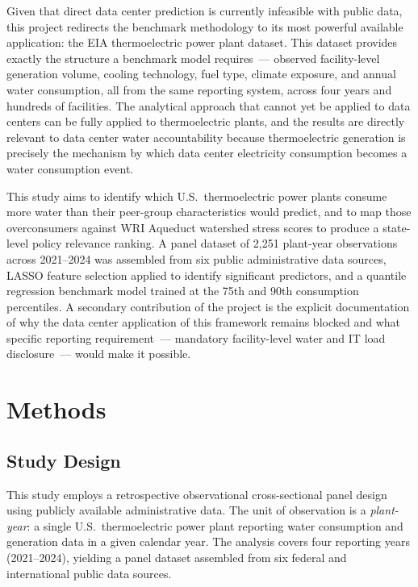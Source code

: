 \documentclass[11pt, letterpaper]{article}
\begin{document}
Given that direct data center prediction is currently infeasible with public data, this project redirects the benchmark methodology to its most powerful available application: the EIA thermoelectric power plant dataset. This dataset provides exactly the structure a benchmark model requires~--- observed facility-level generation volume, cooling technology, fuel type, climate exposure, and annual water consumption, all from the same reporting system, across four years and hundreds of facilities. The analytical approach that cannot yet be applied to data centers can be fully applied to thermoelectric plants, and the results are directly relevant to data center water accountability because thermoelectric generation is precisely the mechanism by which data center electricity consumption becomes a water consumption event.

This study aims to identify which U.S.\ thermoelectric power plants consume more water than their peer-group characteristics would predict, and to map those overconsumers against WRI Aqueduct watershed stress scores to produce a state-level policy relevance ranking. A panel dataset of 2{,}251 plant-year observations across 2021--2024 was assembled from six public administrative data sources, LASSO feature selection applied to identify significant predictors, and a quantile regression benchmark model trained at the 75th and 90th consumption percentiles. A secondary contribution of the project is the explicit documentation of why the data center application of this framework remains blocked and what specific reporting requirement~--- mandatory facility-level water and IT load disclosure~--- would make it possible.

\section{Methods}

\subsection{Study Design}

This study employs a retrospective observational cross-sectional panel design using publicly available administrative data. The unit of observation is a \textit{plant-year}: a single U.S.\ thermoelectric power plant reporting water consumption and generation data in a given calendar year. The analysis covers four reporting years (2021--2024), yielding a panel dataset assembled from six federal and international public data sources.
\end{document}
